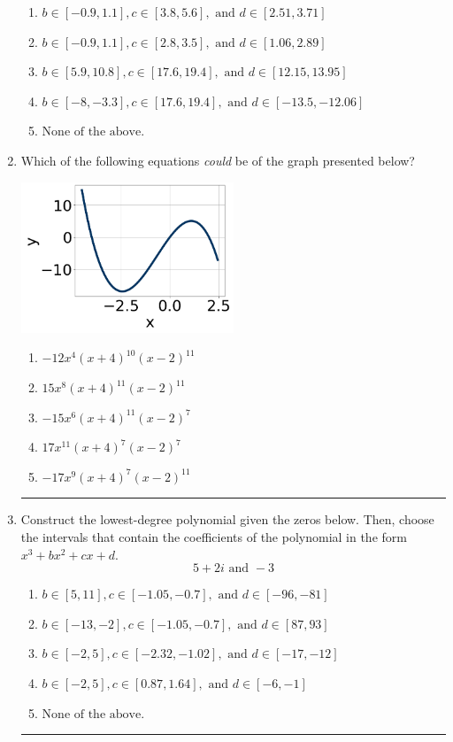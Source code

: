 \documentclass[14pt]{extbook}
\newcommand{\litem}[1]{\item#1\hspace*{-1cm}\rule{\textwidth}{0.4pt}}
\begin{document}
\begin{enumerate}
{\begin{enumerate}[label=\Alph*.]
\item \( b \in [-0.9, 1.1], c \in [3.8, 5.6], \text{ and } d \in [2.51, 3.71] \)
\item \( b \in [-0.9, 1.1], c \in [2.8, 3.5], \text{ and } d \in [1.06, 2.89] \)
\item \( b \in [5.9, 10.8], c \in [17.6, 19.4], \text{ and } d \in [12.15, 13.95] \)
\item \( b \in [-8, -3.3], c \in [17.6, 19.4], \text{ and } d \in [-13.5, -12.06] \)
\item \( \text{None of the above.} \)

\end{enumerate} }
\litem{
Which of the following equations \textit{could} be of the graph presented below?
\begin{center}
    \includegraphics[width=0.5\textwidth]{../Figures/polyGraphToFunctionB.png}
\end{center}
\begin{enumerate}[label=\Alph*.]
\item \( -12x^{4} (x + 4)^{10} (x - 2)^{11} \)
\item \( 15x^{8} (x + 4)^{11} (x - 2)^{11} \)
\item \( -15x^{6} (x + 4)^{11} (x - 2)^{7} \)
\item \( 17x^{11} (x + 4)^{7} (x - 2)^{7} \)
\item \( -17x^{9} (x + 4)^{7} (x - 2)^{11} \)

\end{enumerate} }
\litem{
Construct the lowest-degree polynomial given the zeros below. Then, choose the intervals that contain the coefficients of the polynomial in the form $x^3+bx^2+cx+d$.\[ 5 + 2 i \text{ and } -3 \]\begin{enumerate}[label=\Alph*.]
\item \( b \in [5, 11], c \in [-1.05, -0.7], \text{ and } d \in [-96, -81] \)
\item \( b \in [-13, -2], c \in [-1.05, -0.7], \text{ and } d \in [87, 93] \)
\item \( b \in [-2, 5], c \in [-2.32, -1.02], \text{ and } d \in [-17, -12] \)
\item \( b \in [-2, 5], c \in [0.87, 1.64], \text{ and } d \in [-6, -1] \)
\item \( \text{None of the above.} \)


\end{enumerate}}
\end{enumerate}
\end{document}
